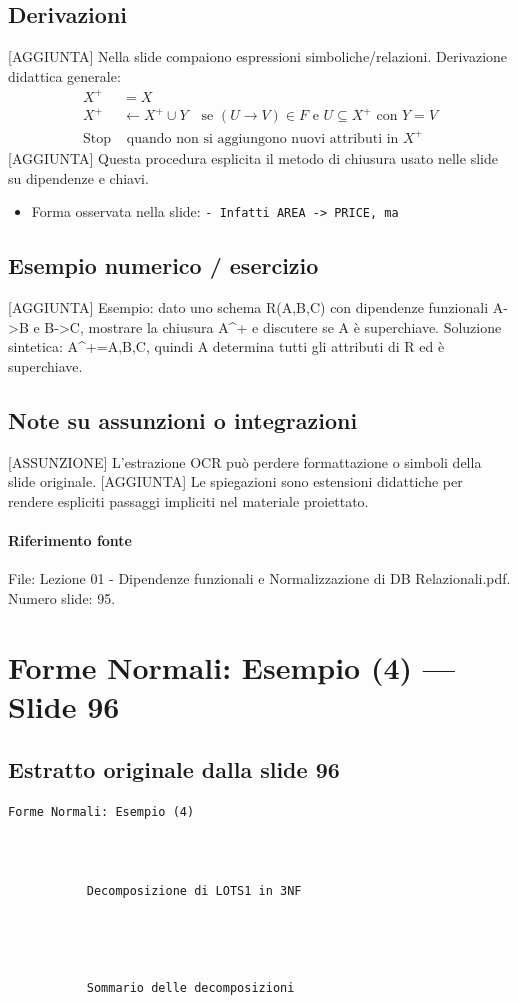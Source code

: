 \documentclass[11pt]{article}
\begin{document}
\subsection*{Derivazioni}
[AGGIUNTA] Nella slide compaiono espressioni simboliche/relazioni. Derivazione didattica generale:
\begin{align*}
X^+ &= X \\
X^+ &\leftarrow X^+ \cup Y \quad \text{se } (U \to V) \in F \text{ e } U \subseteq X^+ \text{ con } Y=V \\
\text{Stop} &\text{ quando non si aggiungono nuovi attributi in } X^+
\end{align*}
[AGGIUNTA] Questa procedura esplicita il metodo di chiusura usato nelle slide su dipendenze e chiavi.
\begin{itemize}[leftmargin=*]
\item Forma osservata nella slide: \texttt{-    Infatti AREA -> PRICE, ma}
\end{itemize}
\subsection*{Esempio numerico / esercizio}
[AGGIUNTA] Esempio: dato uno schema R(A,B,C) con dipendenze funzionali A->B e B->C, mostrare la chiusura A^+ e discutere se A è superchiave. Soluzione sintetica: A^+={A,B,C}, quindi A determina tutti gli attributi di R ed è superchiave.
\subsection*{Note su assunzioni o integrazioni}
[ASSUNZIONE] L'estrazione OCR può perdere formattazione o simboli della slide originale.
[AGGIUNTA] Le spiegazioni sono estensioni didattiche per rendere espliciti passaggi impliciti nel materiale proiettato.
\paragraph{Riferimento fonte} File: Lezione 01 - Dipendenze funzionali e Normalizzazione di DB Relazionali.pdf. Numero slide: 95.
\section{Forme Normali: Esempio (4) --- Slide 96}
\subsection*{Estratto originale dalla slide 96}
\begin{lstlisting}
Forme Normali: Esempio (4)



           Decomposizione di LOTS1 in 3NF




           Sommario delle decomposizioni
\end{lstlisting}
\end{document}
